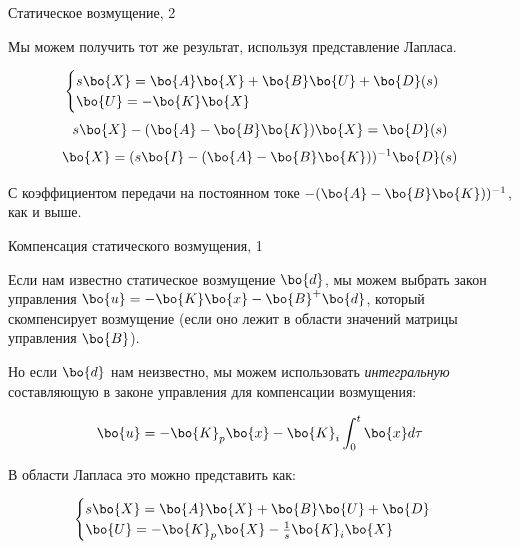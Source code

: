 \documentclass{beamer}
\begin{document}
\begin{frame}{Статическое возмущение, 2}
	\begin{flushleft}
		
		Мы можем получить тот же результат, используя представление Лапласа. 
		
		\begin{equation}
			\begin{cases}
				s \bo{X} = \bo{A} \bo{X} + \bo{B} \bo{U} + \bo{D}(s) \\
				\bo{U} = -\bo{K}\bo{X}
			\end{cases}
		\end{equation}
		\begin{equation}
			s \bo{X} -( \bo{A} - \bo{B} \bo{K})\bo{X} =\bo{D}(s)
		\end{equation}
		\begin{equation}
			\bo{X} =(s \bo{I} -( \bo{A} - \bo{B} \bo{K}))^{-1} \bo{D}(s)
		\end{equation}
		
		С коэффициентом передачи на постоянном токе $-( \bo{A} - \bo{B} \bo{K}))^{-1}$, как и выше.
		
		
	\end{flushleft}
\end{frame}

\begin{frame}{Компенсация статического возмущения, 1}
	\begin{flushleft}
		
		Если нам известно статическое возмущение $\bo{d}$, мы можем выбрать закон управления $\bo{u} = -\bo{K}\bo{x} - \bo{B}^+\bo{d}$, который скомпенсирует возмущение (если оно лежит в области значений матрицы управления $\bo{B}$).
		
		\bigskip
		
		Но если $\bo{d}$ нам неизвестно, мы можем использовать \emph{интегральную} составляющую в законе управления для компенсации возмущения:
		
		\begin{equation}
			\bo{u} = -\bo{K}_p\bo{x} -\bo{K}_i \int_{0}^{t} \bo{x} d \tau
		\end{equation}
		
		В области Лапласа это можно представить как:
		
		
		\begin{equation}
			\begin{cases}
				s \bo{X} = \bo{A} \bo{X} + \bo{B} \bo{U} + \bo{D} \\
				\bo{U} = -\bo{K}_p\bo{X} -\frac{1}{s}\bo{K}_i \bo{X}
			\end{cases}
		\end{equation}
		
		
	\end{flushleft}
\end{frame}
\end{document}

